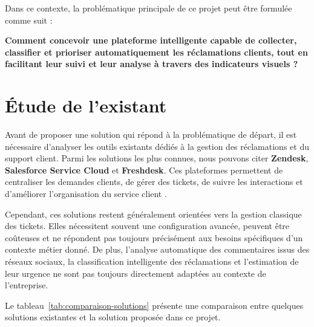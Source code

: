 \documentclass[12pt,a4paper,oneside]{report}
\begin{document}
Dans ce contexte, la problématique principale de ce projet peut être formulée comme suit :

\textbf{Comment concevoir une plateforme intelligente capable de collecter, classifier et prioriser automatiquement les réclamations clients, tout en facilitant leur suivi et leur analyse à travers des indicateurs visuels ?}

\section{Étude de l’existant}

Avant de proposer une solution qui répond à la problématique de départ, il est nécessaire d’analyser les outils existants dédiés à la gestion des réclamations et du support client. Parmi les solutions les plus connues, nous pouvons citer \textbf{Zendesk}, \textbf{Salesforce Service Cloud} et \textbf{Freshdesk}. Ces plateformes permettent de centraliser les demandes clients, de gérer des tickets, de suivre les interactions et d’améliorer l’organisation du service client \cite{zendesk, salesforce, freshdesk}.

Cependant, ces solutions restent généralement orientées vers la gestion classique des tickets. Elles nécessitent souvent une configuration avancée, peuvent être coûteuses et ne répondent pas toujours précisément aux besoins spécifiques d’un contexte métier donné. De plus, l’analyse automatique des commentaires issus des réseaux sociaux, la classification intelligente des réclamations et l’estimation de leur urgence ne sont pas toujours directement adaptées au contexte de l’entreprise.

Le tableau~\ref{tab:comparaison-solutions} présente une comparaison entre quelques solutions existantes et la solution proposée dans ce projet.
\end{document}

